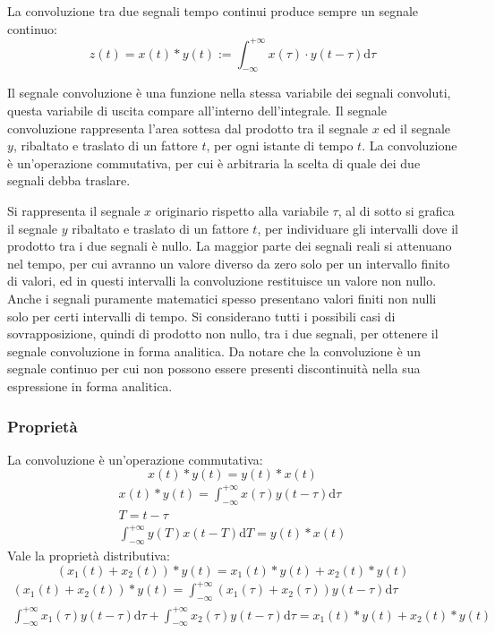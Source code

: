 \documentclass{article}
\newcommand{\df}{\mathrm{d}}
\numberwithin{equation}{subsection}
\begin{document}
La convoluzione tra due segnali tempo continui produce sempre un segnale continuo: 
\begin{equation}
    z(t)=x(t)*y(t):=\displaystyle\int_{-\infty}^{+\infty}x(\tau)\cdot y(t-\tau)\df\tau
\end{equation}

Il segnale convoluzione è una funzione nella stessa variabile dei segnali convoluti, questa variabile di uscita compare all'interno dell'integrale. Il segnale convoluzione 
rappresenta l'area sottesa dal prodotto tra il segnale $x$ ed il segnale $y$, ribaltato e traslato di un fattore $t$, per ogni istante di tempo $t$. La convoluzione 
è un'operazione commutativa, per cui è arbitraria la scelta di quale dei due segnali debba traslare. 

Si rappresenta il segnale $x$ originario rispetto alla variabile $\tau$, al di sotto si grafica il segnale $y$ ribaltato e traslato di un fattore $t$, per individuare gli 
intervalli dove il prodotto tra i due segnali è nullo. La maggior parte dei segnali reali si attenuano nel tempo, per cui avranno un valore diverso da zero solo per un 
intervallo finito di valori, ed in questi intervalli la convoluzione restituisce un valore non nullo. Anche i segnali puramente matematici spesso presentano valori finiti 
non nulli solo per certi intervalli di tempo. Si considerano tutti i possibili casi di sovrapposizione, quindi di prodotto non nullo, tra i due segnali, per ottenere 
il segnale convoluzione in forma analitica. Da notare che la convoluzione è un segnale continuo per cui non possono essere presenti discontinuità nella sua espressione 
in forma analitica. 

\subsubsection{Proprietà}

La convoluzione è un'operazione commutativa:
\begin{equation}
    x(t)*y(t)=y(t)*x(t)
\end{equation}
\begin{gather*}
    x(t)*y(t)=\displaystyle\int_{-\infty}^{+\infty}x(\tau)y(t-\tau)\df\tau\\
    {T=t-\tau}\\
    \int_{-\infty}^{+\infty}y(T)x(t-T)\df T=y(t)*x(t)
\end{gather*}
Vale la proprietà distributiva:
\begin{equation}
    (x_1(t)+x_2(t))*y(t)=x_1(t)*y(t)+x_2(t)*y(t)
\end{equation}
\begin{gather*}
    (x_1(t)+x_2(t))*y(t)=\displaystyle\int_{-\infty}^{+\infty}(x_1(\tau)+x_2(\tau))y(t-\tau)\df\tau\\
    \int_{-\infty}^{+\infty}x_1(\tau)y(t-\tau)\df\tau+\int_{-\infty}^{+\infty}x_2(\tau)y(t-\tau)\df\tau=x_1(t)*y(t)+x_2(t)*y(t)
\end{gather*}
\end{document}
